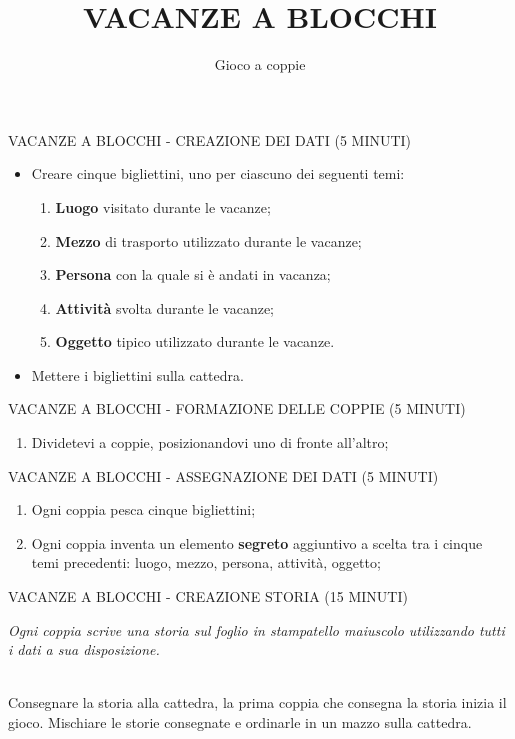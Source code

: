 \documentclass[aspectratio=1610]{beamer}
\title{VACANZE A BLOCCHI}
\subtitle{Gioco a coppie}
\date{}
\institute{Materiale necessario: cinque bigliettini e una penna a testa, un foglio per ciascuna coppia.}
\begin{document}
\begin{frame}
    \titlepage
\end{frame}

\begin{frame}{VACANZE A BLOCCHI - CREAZIONE DEI DATI (5 MINUTI) }
    \begin{itemize}
        \item Creare cinque bigliettini, uno per ciascuno dei seguenti temi:
              \begin{enumerate}
                  \item \textbf{Luogo} visitato durante le vacanze;
                  \item \textbf{Mezzo} di trasporto utilizzato durante le vacanze;
                  \item \textbf{Persona} con la quale si è andati in vacanza;
                  \item \textbf{Attività} svolta durante le vacanze;
                  \item \textbf{Oggetto} tipico utilizzato durante le vacanze.
              \end{enumerate}
        \pause
        \item Mettere i bigliettini sulla cattedra.
    \end{itemize}
\end{frame}

\begin{frame}{VACANZE A BLOCCHI - FORMAZIONE DELLE COPPIE (5 MINUTI)}
    \begin{enumerate}
        \item Dividetevi a coppie, posizionandovi uno di fronte all'altro;
    \end{enumerate}
\end{frame}

\begin{frame}{VACANZE A BLOCCHI - ASSEGNAZIONE DEI DATI (5 MINUTI)} 
    \begin{enumerate}
        \item Ogni coppia pesca cinque bigliettini;
        \pause
        \item Ogni coppia inventa un elemento \textbf{segreto} aggiuntivo a scelta tra i cinque temi precedenti: luogo, mezzo, persona, attività, oggetto;
    \end{enumerate}
\end{frame}

\begin{frame}{VACANZE A BLOCCHI - CREAZIONE STORIA (15 MINUTI)}
    \begin{minipage}{0.98\linewidth}
        \centering
        \huge
        \textit{Ogni coppia scrive una storia sul foglio in stampatello maiuscolo 
        utilizzando tutti i dati a sua disposizione.}\\
    \end{minipage}\\
    \bigskip
    \pause
    Consegnare la storia alla cattedra, la prima coppia che consegna la storia inizia il gioco.
    \pause
    Mischiare le storie consegnate e ordinarle in un mazzo sulla cattedra.
    
\end{frame}
\end{document}
